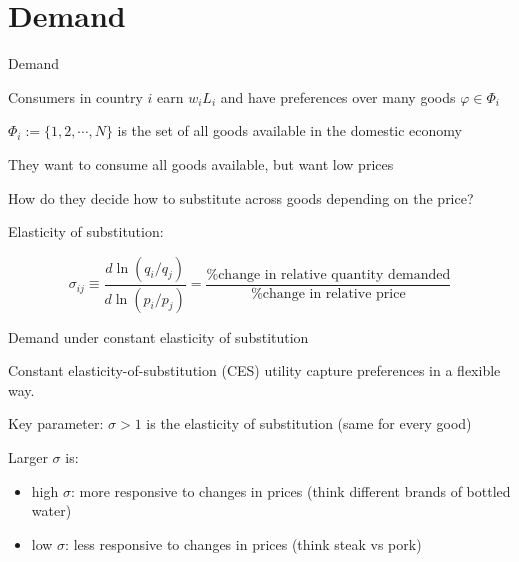 \documentclass[notes,11pt, aspectratio=169, xcolor=table]{beamer}
\newenvironment{wideitemize}{\itemize\addtolength{\itemsep}{10pt}}{\enditemize}
\begin{document}
\section{Demand}

\begin{frame}{Demand}
    \begin{wideitemize}
        \item Consumers in country $i$ earn $w_iL_i$ and have preferences over many goods $\varphi \in \Phi_i$ 
        \item $\Phi_i := \{1,2,\cdots, N\}$ is the set of all goods available in the domestic economy
        \item They want to consume all goods available, but want low prices

        \item How do they decide how to substitute across goods depending on the price?

        \item Elasticity of substitution:

        \begin{equation*}
            \sigma_{ij} \equiv \frac{d \ln (q_i/q_j)}{d \ln (p_i/p_j)} = \frac{\text{\% change in relative quantity demanded}}{\text{\% change in relative price}}
        \end{equation*}

    \end{wideitemize}    
\end{frame}

\begin{frame}{Demand under constant elasticity of substitution}

\begin{wideitemize}
            \item Constant elasticity-of-substitution (CES) utility capture preferences in a flexible way.

            \item Key parameter:  $\sigma > 1$ is the elasticity of substitution (same for every good)
            
            \item Larger $\sigma$ is:
            \begin{itemize}
                \item high $\sigma$: more responsive to changes in prices (think different brands of bottled water) 
                \item low $\sigma$: less responsive to changes in prices (think steak vs pork)
            \end{itemize}


\end{wideitemize}
    
\end{frame}
\end{document}
